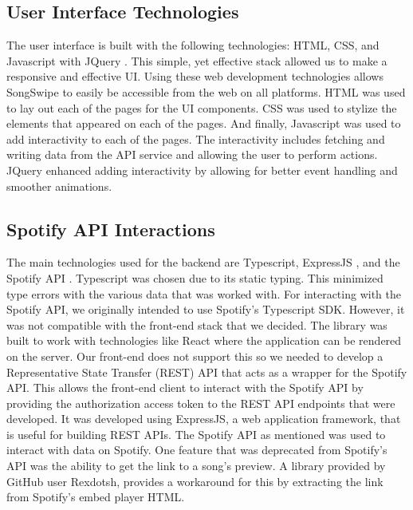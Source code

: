 \documentclass{article}
\begin{document}
\subsection{User Interface Technologies}
\quad The user interface is built with the following technologies: HTML, CSS, and Javascript with JQuery \cite{jquery}. This simple, yet effective stack allowed us to make a responsive and effective UI. Using these web development technologies allows SongSwipe to easily be accessible from the web on all platforms. HTML was used to lay out each of the pages for the UI components. CSS was used to stylize the elements that appeared on each of the pages. And finally, Javascript was used to add interactivity to each of the pages. The interactivity includes fetching and writing data from the API service and allowing the user to perform actions. JQuery enhanced adding interactivity by allowing for better event handling and smoother animations. \\ 

\subsection{Spotify API Interactions}
\quad The main technologies used for the backend are Typescript, ExpressJS \cite{expressjs}, and the Spotify API \cite{Spotify_docs}. Typescript was chosen due to its static typing. This minimized type errors with the various data that was worked with. For interacting with the Spotify API, we originally intended to use Spotify's Typescript SDK. However, it was not compatible with the front-end stack that we decided. The library was built to work with technologies like React where the application can be rendered on the server. Our front-end does not support this so we needed to develop a Representative State Transfer (REST) API that acts as a wrapper for the Spotify API. This allows the front-end client to interact with the Spotify API by providing the authorization access token to the REST API endpoints that were developed. It was developed using ExpressJS, a web application framework, that is useful for building REST APIs. The Spotify API as mentioned was used to interact with data on Spotify. One feature that was deprecated from Spotify's API was the ability to get the link to a song's preview. A library \cite{Spotify_preview_url} provided by GitHub user Rexdotsh, provides a workaround for this by extracting the link from Spotify's embed player HTML.
\end{document}

